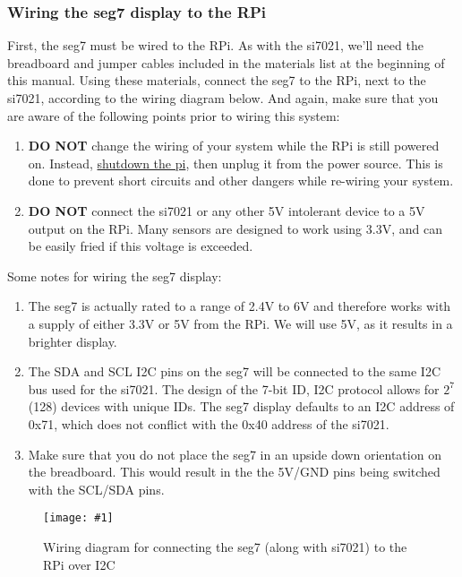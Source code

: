 \documentclass{article}
\newcommand{\imagefigb}[2]{
    \begin{figure}[H]
        \centering
        \texttt{[image: \#1]}
        \caption{#2}
    \end{figure}
}
\begin{document}
    \subsubsection{Wiring the seg7 display to the RPi}
    First, the seg7 must be wired to the RPi. As with the si7021, we'll need the breadboard and jumper cables included in the materials list at the beginning of this manual. Using these materials, connect the seg7 to the RPi, next to the si7021, according to the wiring diagram below. And again, make sure that you are aware of the following points prior to wiring this system:
    \begin{enumerate}
      \item \textbf{DO NOT} change the wiring of your system while the RPi is still powered on. Instead, \hyperref[sec:shutting-down]{shutdown the pi}, then unplug it from the power source. This is done to prevent short circuits and other dangers while re-wiring your system.
      \item \textbf{DO NOT} connect the si7021 or any other 5V intolerant device to a 5V output on the RPi. Many sensors are designed to work using 3.3V, and can be easily fried if this voltage is exceeded.
    \end{enumerate}
    Some notes for wiring the seg7 display:
    \begin{enumerate}
      \item The seg7 is actually rated to a range of 2.4V to 6V and therefore works with a supply of either 3.3V or 5V from the RPi. We will use 5V, as it results in a brighter display.
      \item The SDA and SCL I2C pins on the seg7 will be connected to the same I2C bus used for the si7021. The design of the 7-bit ID, I2C protocol allows for $2^7$ (128) devices with unique IDs. The seg7 display defaults to an I2C address of 0x71, which does not conflict with the 0x40 address of the si7021.
      \item Make sure that you do not place the seg7 in an upside down orientation on the breadboard. This would result in the the 5V/GND pins being switched with the SCL/SDA pins.
    \end{enumerate}
    \newline
    \noindent
    \imagefigb{si7021-seg7-wiring-diagram.png}{Wiring diagram for connecting the seg7 (along with si7021) to the RPi over I2C}
\end{document}
